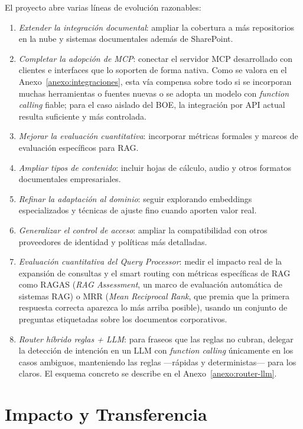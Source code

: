 El proyecto abre varias líneas de evolución razonables:

\begin{enumerate}
    \item \textit{Extender la integración documental}: ampliar la cobertura a más repositorios en la nube y sistemas documentales además de SharePoint.
    \item \textit{Completar la adopción de MCP}: conectar el servidor MCP desarrollado con clientes e interfaces que lo soporten de forma nativa. Como se valora en el Anexo~\ref{anexo:integraciones}, esta vía compensa sobre todo si se incorporan muchas herramientas o fuentes nuevas o se adopta un modelo con \textit{function calling} fiable; para el caso aislado del BOE, la integración por API actual resulta suficiente y más controlada.
    \item \textit{Mejorar la evaluación cuantitativa}: incorporar métricas formales y marcos de evaluación específicos para RAG.
    \item \textit{Ampliar tipos de contenido}: incluir hojas de cálculo, audio y otros formatos documentales empresariales.
    \item \textit{Refinar la adaptación al dominio}: seguir explorando embeddings especializados y técnicas de ajuste fino cuando aporten valor real.
    \item \textit{Generalizar el control de acceso}: ampliar la compatibilidad con otros proveedores de identidad y políticas más detalladas.
    \item \textit{Evaluación cuantitativa del Query Processor}: medir el impacto real de la expansión de consultas y el smart routing con métricas específicas de RAG como RAGAS (\textit{RAG Assessment}, un marco de evaluación automática de sistemas RAG) o MRR (\textit{Mean Reciprocal Rank}, que premia que la primera respuesta correcta aparezca lo más arriba posible), usando un conjunto de preguntas etiquetadas sobre los documentos corporativos.

    \item \textit{Router híbrido reglas + LLM}: para fraseos que las reglas no cubran, delegar la detección de intención en un LLM con \textit{function calling} únicamente en los casos ambiguos, manteniendo las reglas ---rápidas y deterministas--- para los claros. El esquema concreto se describe en el Anexo~\ref{anexo:router-llm}.
\end{enumerate}

\section{Impacto y Transferencia}

